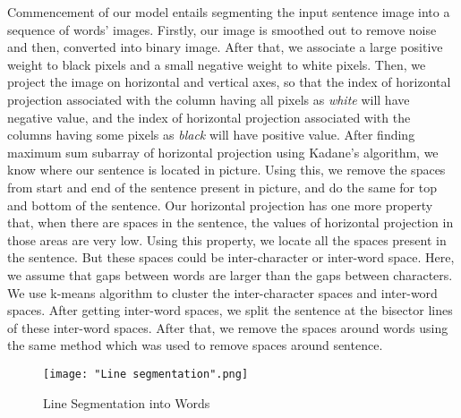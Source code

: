 \documentclass[a4paper, 10pt,twocolumn]{article}
\begin{document}
Commencement of our model entails segmenting the input sentence image into a sequence of words' images. Firstly, our image is smoothed out to remove noise and then, converted into binary image. After that, we associate a large positive weight to black pixels and a small negative weight to white pixels. Then, we project the image on horizontal and vertical axes, so that the index of horizontal projection associated with the column having all pixels as \emph{white} will have negative value, and the index of horizontal projection associated with the columns having some pixels as \emph{black} will have positive value. After finding maximum sum subarray of horizontal projection using Kadane's algorithm, we know where our sentence is located in picture. Using this, we remove the spaces from start and end of the sentence present in picture, and do the same for top and bottom of the sentence. Our horizontal projection has one more property that, when there are spaces in the sentence, the values of horizontal projection in those areas are very low. Using this property, we locate all the spaces present in the sentence. But these spaces could be inter-character or inter-word space. Here, we assume that gaps between words are larger than the gaps between characters. We use k-means algorithm to cluster the inter-character spaces and inter-word spaces. After getting inter-word spaces, we split the sentence at the bisector lines of these inter-word spaces. After that, we remove the spaces around words using the same method which was used to remove spaces around sentence.

\begin{figure}[h]
\centering
\texttt{[image: "Line segmentation".png]}
\caption{Line Segmentation into Words}
\end{figure}
\end{document}
